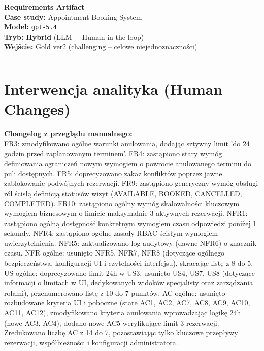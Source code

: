 \documentclass[12pt,a4paper]{article}
\begin{document}
\begin{center}
  {\LARGE\bfseries Requirements Artifact}\\[1.5em]
  {\large \textbf{Case study:} Appointment Booking System}\\[0.3em]
  {\large \textbf{Model:} \texttt{gpt-5.4}}\\[0.3em]
  {\large \textbf{Tryb:} \textbf{Hybrid} (LLM + Human-in-the-loop)}\\[0.3em]
  {\large \textbf{Wejście:} Gold ver2 (challenging -- celowe niejednoznaczności)}
\end{center}

\vspace{1em}\hrule\vspace{1.5em}

\section{Interwencja analityka (Human Changes)}

\begin{mdframed}[backgroundcolor=promptbg, linewidth=0pt, innerleftmargin=10pt, innerrightmargin=10pt, innertopmargin=8pt, innerbottommargin=8pt]
\small
\textbf{Changelog z przeglądu manualnego:}\\
FR3: zmodyfikowano ogólne warunki anulowania, dodając sztywny limit 'do 24 godzin przed zaplanowanym terminem'. 
FR4: zastąpiono stary wymóg definiowania ograniczeń nowym wymogiem o powrocie anulowanego terminu do puli dostępnych. 
FR5: doprecyzowano zakaz konfliktów poprzez jawne zablokowanie podwójnych rezerwacji. 
FR9: zastąpiono generyczny wymóg obsługi ról ścisłą definicją statusów wizyt (AVAILABLE, BOOKED, CANCELLED, COMPLETED). 
FR10: zastąpiono ogólny wymóg skalowalności kluczowym wymogiem biznesowym o limicie maksymalnie 3 aktywnych rezerwacji. 
NFR1: zastąpiono ogólną dostępność konkretnym wymogiem czasu odpowiedzi poniżej 1 sekundy. 
NFR4: zastąpiono ogólne zasady RBAC ścisłym wymogiem uwierzytelnienia. 
NFR5: zaktualizowano log audytowy (dawne NFR6) o znacznik czasu. 
NFR ogólne: usunięto NFR5, NFR7, NFR8 (dotyczące ogólnego bezpieczeństwa, konfiguracji UI i czytelności interfejsu), skracając listę z 8 do 5. 
US ogólne: doprecyzowano limit 24h w US3, usunięto US4, US7, US8 (dotyczące informacji o limitach w UI, dedykowanych widoków specjalisty oraz zarządzania rolami), przenumerowano listę z 10 do 7 punktów. 
AC ogólne: usunięto rozbudowane kryteria UI i poboczne (stare AC1, AC2, AC7, AC8, AC9, AC10, AC11, AC12), zmodyfikowano kryteria anulowania wprowadzając logikę 24h (nowe AC3, AC4), dodano nowe AC5 weryfikujące limit 3 rezerwacji. Zredukowano liczbę AC z 14 do 7, pozostawiając tylko kluczowe przepływy rezerwacji, współbieżności i konfiguracji administratora.
\end{mdframed}
\end{document}
